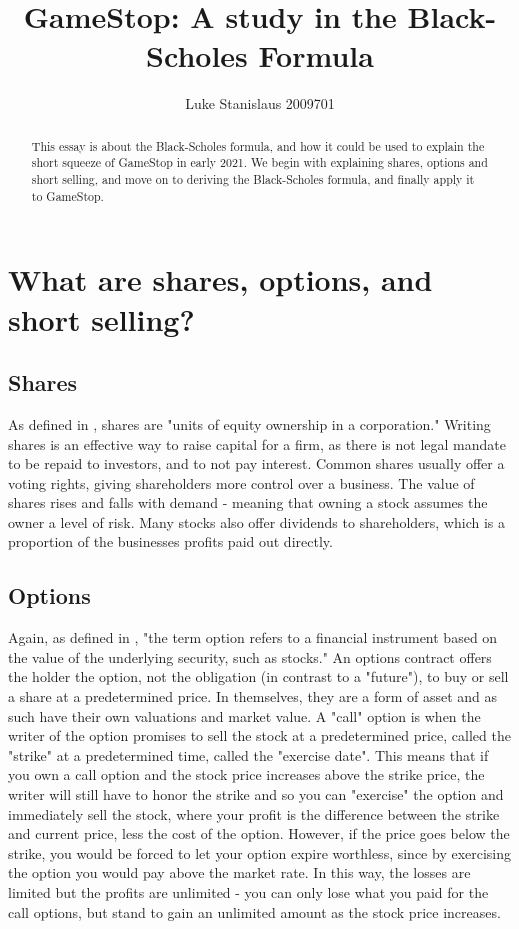 \documentclass[11pt]{article} %
\title{GameStop: A study in the Black-Scholes Formula}
\author{Luke Stanislaus 2009701}
\begin{document}
\maketitle

\begin{abstract}
    This essay is about the Black-Scholes formula, and how it could be 
    used to explain the short squeeze of GameStop in early 2021. We begin 
    with explaining shares, options and short selling, and move on to 
    deriving the Black-Scholes formula, and finally apply it to GameStop.
    \end{abstract}



\section{What are shares, options, and short selling?}
\subsection{Shares}
As defined in \cite{shares}, shares are "units of equity 
ownership in a corporation." Writing shares is an effective way to raise 
capital for a firm, as there is not legal mandate to be repaid to 
investors, and to not pay interest. Common shares usually offer a voting 
rights, giving shareholders more control over a business. The value of 
shares rises and falls with demand - meaning that owning a stock assumes 
the owner a level of risk. Many stocks also offer dividends to 
shareholders, which is a proportion of the businesses profits paid out 
directly.
\subsection{Options}
Again, as defined in \cite{options}, "the term option refers to a 
financial instrument based on the value of the underlying security, 
such as stocks." An options contract offers the holder the option, 
not the obligation (in contrast to a "future"), to buy or sell a share 
at a predetermined price. In themselves, they are a form of asset and 
as such have their own valuations and market value. A "call" option 
is when the writer of the option promises to sell the stock at a 
predetermined price, called the "strike" at a predetermined time, 
called the "exercise date". This means that if you own a call option and 
the stock price increases above the strike price, the writer will still have 
to honor the strike and so you can "exercise" the option 
and immediately sell the stock, where your profit is the difference 
between the strike and current price, less the cost of the option. 
However, if the price goes below the strike, you would be forced 
to let your option expire worthless, since by exercising the option 
you would pay above the market rate. In this way, the losses are limited 
but the profits are unlimited - you can only lose what you paid for the 
call options, but stand to gain an unlimited amount as the stock price 
increases. 
\end{document}
